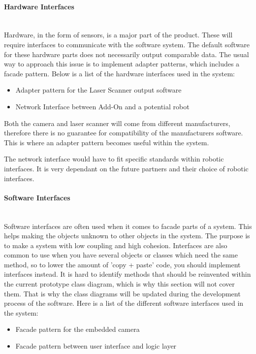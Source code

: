 \paragraph*{Hardware Interfaces}~\\
Hardware, in the form of sensors, is a major part of the product. These will require interfaces to communicate with the software system. The default software for these hardware parts does not necessarily output comparable data. The usual way to approach this issue is to implement adapter patterns, which includes a facade pattern. Below is a list of the hardware interfaces used in the system:

\begin{itemize}

\item Adapter pattern for the Laser Scanner output software
\item Network Interface between Add-On and a potential robot

\end{itemize}

Both the camera and laser scanner will come from different manufacturers, therefore there is no guarantee for compatibility of the manufacturers software. This is where an adapter pattern becomes useful within the system.

The network interface would have to fit specific standards within robotic interfaces. It is very dependant on the future partners and their choice of robotic interfaces.
  
\paragraph*{Software Interfaces}~\\
Software interfaces are often used when it comes to facade parts of a system. This helps making the objects unknown to other objects in the system. The purpose is to make a system with low coupling and high cohesion. Interfaces are also common to use when you have several objects or classes which need the same method, so to lower the amount of 'copy + paste' code, you should implement interfaces instead. It is hard to identify methods that should be reinvented within the current prototype class diagram, which is why this section will not cover them. That is why the class diagrams will be updated during the development process of the software. Here is a list of the different software interfaces used in the system:

\begin{itemize}

\item Facade pattern for the embedded camera
\item Facade pattern between user interface and logic layer

\end{itemize}

